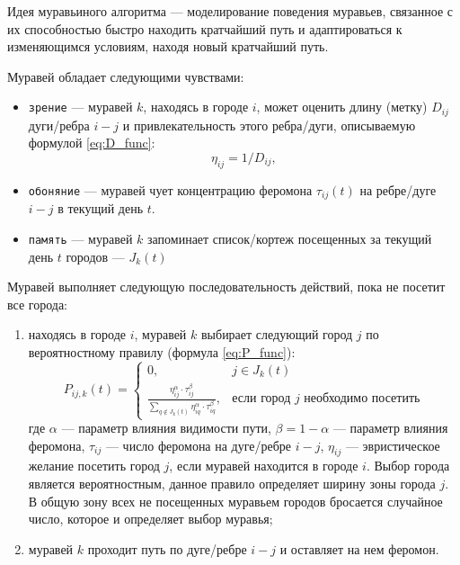 Идея муравьиного алгоритма \cite{info_antAlg} --- моделирование поведения муравьев, связанное с их способностью быстро находить кратчайший путь и адаптироваться к изменяющимся условиям, находя новый кратчайший путь.

Муравей обладает следующими чувствами:

\begin{itemize}[label*=--]
	\item \texttt{зрение} --- муравей $k$, находясь в городе $i$, может оценить длину (метку) $D_{ij}$ дуги/ребра $i-j$ и привлекательность этого ребра/дуги, описываемую формулой \ref{eq:D_func}:
	\begin{equation}
		\label{eq:D_func}
		\eta_{ij} = 1 / D_{ij},
	\end{equation}
	
	\item \texttt{обоняние} --- муравей чует концентрацию феромона $\tau_{ij}(t)$ на ребре/дуге $i-j$ в текущий день $t$.
	
	\item \texttt{память} --- муравей $k$ запоминает список/кортеж посещенных за текущий день $t$ городов --- $J_k(t)$
\end{itemize}

Муравей выполняет следующую последовательность действий, пока не посетит все города:

\begin{enumerate}[label={\arabic*)}]
	\item находясь в городе $i$, муравей $k$ выбирает следующий город $j$ по вероятностному правилу (формула \ref{eq:P_func}):
	\begin{equation}
		\label{eq:P_func}
		P_{ij, k}(t) = 
		\begin{cases}
			0,  & j \in J_k(t) \\
			\frac{\eta_{ij}^\alpha \cdot \tau_{ij}^\beta}{\displaystyle\sum_{q \notin J_k(t)} \eta^\alpha_{iq} \cdot \tau^\beta_{iq}}, & \textrm{если город $j$ необходимо посетить} 
		\end{cases}
	\end{equation}
	где $\alpha$ --- параметр влияния видимости пути, $\beta = 1 - \alpha$ --- параметр влияния феромона, $\tau_{ij}$ --- число феромона на дуге/ребре $i-j$, $\eta_{ij}$ --- эвристическое желание посетить город $j$, если муравей находится в городе $i$. 
	Выбор города является вероятностным, данное правило определяет ширину зоны города $j$. 
	В общую зону всех не посещенных муравьем городов бросается случайное число, которое и определяет выбор муравья;
	\item муравей $k$ проходит путь по дуге/ребре $i-j$ и оставляет на нем феромон.
\end{enumerate}

